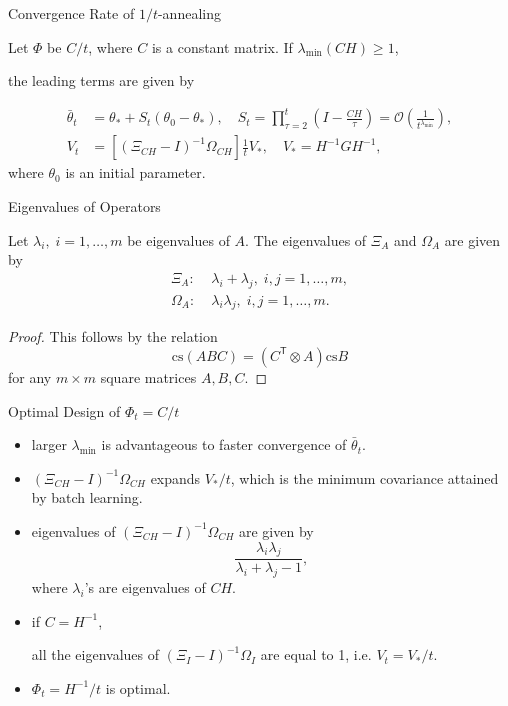 \documentclass[fleqn,aspectratio=1610]{beamer}
\begin{document}
\begin{frame}[label={sec:org9f5b239}]{Convergence Rate of \(1/t\)-annealing}
\begin{theorem}[]\label{sec:org53e994a}
Let \(\varPhi\) be \(C/t\), where \(C\) is a constant matrix.
If \(\lambda_{\min}(CH)\geq 1\), 

the leading terms are given by

\begin{align}
  \bar\theta_{t}
  &=\theta_{*}+S_{t}(\theta_{0}-\theta_{*}),
    \quad
    S_{t}
    =\prod_{\tau=2}^{t}\left(I-\frac{CH}{\tau}\right)
    =\mathcal{O}\left(\frac{1}{t^{\lambda_{\min}}}\right),\\
  V_{t}
  &=\left[\left(\Xi_{CH}-I\right)^{-1}\Omega_{CH}\right]\frac{1}{t}V_{*},
    \quad V_{*}=H^{-1}GH^{-1},
\end{align}
where \(\theta_{0}\) is an initial parameter.
\end{theorem}
\end{frame}
\begin{frame}[label={sec:org0b7d595}]{Eigenvalues of Operators}
\begin{lemma}[]\label{sec:org18e2ea7}
Let \(\lambda_{i},\;i=1,\dotsc,m\) be eigenvalues of \(A\).
The eigenvalues of \(\Xi_{A}\) and \(\Omega_{A}\) are given by
\begin{align}
  \Xi_{A}:\;&\lambda_{i}+\lambda_{j},\;i,j=1,\dotsc,m,\\
  \Omega_{A}:\;&\lambda_{i}\lambda_{j},\;i,j=1,\dotsc,m.
\end{align}
\end{lemma}
\begin{proof}[Proof]
This follows by the relation
\begin{equation}
  \mathrm{cs}(ABC)=(C^{\mathsf{T}}\otimes A)\mathrm{cs} B
\end{equation}
for any \(m\times m\) square matrices \(A,B,C\).
\end{proof}
\end{frame}
\begin{frame}[label={sec:orgeb0bdce}]{Optimal Design of \(\varPhi_{t}=C/t\)}
\begin{itemize}
\item larger \(\lambda_{\min}\) is advantageous to faster convergence of
\(\bar\theta_{t}\).
\item \((\Xi_{CH}-I)^{-1}\Omega_{CH}\) expands \(V_{*}/t\), which is the
minimum covariance attained by batch learning.
\item eigenvalues of \((\Xi_{CH}-I)^{-1}\Omega_{CH}\) are given by
\begin{equation}
  \frac{\lambda_{i}\lambda_{j}}{\lambda_{i}+\lambda_{j}-1},
\end{equation}
where \(\lambda_{i}\)'s are eigenvalues of \(CH\).
\item if \(C=H^{-1}\),

all the eigenvalues of \((\Xi_{I}-I)^{-1}\Omega_{I}\) 
are equal to 1, i.e. \(V_{t}=V_{*}/t\).
\item \(\varPhi_{t}=H^{-1}/t\) is optimal.
\end{itemize}
\end{frame}
\end{document}
